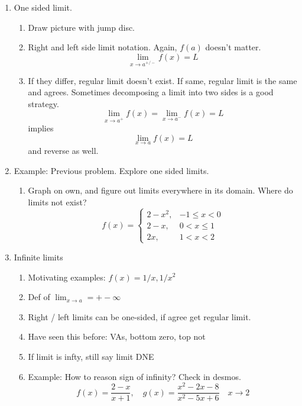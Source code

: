 \documentclass{article}
\begin{document}
\begin{enumerate}
\item One sided limit.
\begin{enumerate}
\item Draw picture with jump disc.
\item Right and left side limit notation. Again, $f(a)$ doesn't matter.
\[
\lim_{x \rightarrow a^{+/-}} f(x) = L
\]
\item If they differ, regular limit doesn't exist. If same, regular limit is the same and agrees. Sometimes decomposing a limit into two sides is a good strategy.
\[
\lim_{x \rightarrow a^{+}} f(x) = \lim_{x \rightarrow a^{-}} f(x) = L
\]
implies
\[ \lim_{x \rightarrow a} f(x) = L
\]
and reverse as well.
\end{enumerate}

\item Example: Previous problem. Explore one sided limits.
\begin{enumerate}
\item Graph on own, and figure out limits everywhere in its domain. Where do limits not exist?
\[
f(x) = \begin{cases}
2-x^2, & -1 \leq x < 0 \\
2-x, & 0<x \leq 1 \\
2x, & 1<x<2
\end{cases}
\]
\end{enumerate}

\item Infinite limits
\begin{enumerate}
\item Motivating examples: $f(x)=1/x, 1/x^2$
\item Def of $\lim_{x \rightarrow a} = +- \infty$
\item Right / left limits can be one-sided, if agree get regular limit. 
\item Have seen this before: VAs, bottom zero, top not
\item If limit is infty, still say limit DNE
\item Example: How to reason sign of infinity? Check in desmos. 
\[
f(x) = \frac{2-x}{x+1}, \quad g(x) = \frac{x^2-2x-8}{x^2-5x+6} \quad x\rightarrow 2
\]
\end{enumerate}
\end{enumerate}
\end{document}
